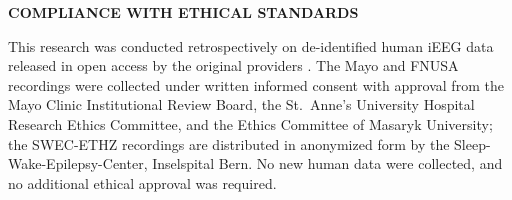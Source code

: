 \documentclass[letterpaper]{article}
\begin{document}
\raggedbottom
\par\medskip
{\centering\bfseries COMPLIANCE WITH ETHICAL STANDARDS\par}
\nopagebreak
\smallskip
\noindent
This research was conducted retrospectively on de-identified human iEEG
data released in open access by the original providers
\cite{burrello2019hyperdimensional, burrello2019laelaps,
nejedly2020multicenter}. The Mayo and FNUSA recordings were collected
under written informed consent with approval from the Mayo Clinic
Institutional Review Board, the St.\ Anne's University Hospital Research
Ethics Committee, and the Ethics Committee of Masaryk University; the
SWEC-ETHZ recordings are distributed in anonymized form by the
Sleep-Wake-Epilepsy-Center, Inselspital Bern. No new human data were
collected, and no additional ethical approval was required.
\end{document}
